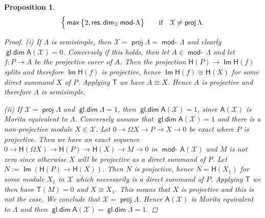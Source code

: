 \documentclass[oneside, a4paper,reqno]{amsart}
\numberwithin{equation}{section}
\newtheorem{prop}[thm]{Proposition}
\theoremstyle{definition}
\begin{document}
\begin{prop}
\[\begin{cases}
\, \operatorname*{\mathsf{max}}\big\{2,\operatorname*{\mathsf{res.dim}}_{\mathcal X}\operatorname*{\mathsf{mod}-\!}\Lambda\big\} \,\,\, & \,\,\, \text{if
\,\, ${\mathcal X}\neq \operatorname*{\mathsf{proj}}\Lambda$.}
\end{cases}
\]
\begin{proof}
(i) If $\Lambda$ is semisimple, then ${\mathcal X} = \operatorname*{\mathsf{proj}}\Lambda =
\operatorname*{\mathsf{mod}-\!}\Lambda$ and clearly $\operatorname*{\mathsf{gl.dim}}\mathsf{A}({\mathcal X}) = 0$. Conversely if
this holds, then let $A\in \operatorname*{\mathsf{mod}-\!}\Lambda$ and let $f \colon P {\longrightarrow} A$
be the projective cover of $A$. Then the projection $\mathsf{H}(P)
\to \operatorname*{\mathsf{Im}}\mathsf{H}(f)$ splits and therefore $\operatorname*{\mathsf{Im}}\mathsf{H}(f)$
is projective, hence $\operatorname*{\mathsf{Im}}\mathsf{H}(f) \cong \mathsf{H}(X)$ for
some direct summand $X$ of $P$. Applying  $\mathsf{T}$ we have $A
\cong X$. Hence $A$ is projective and therefore $\Lambda$ is
semisimple.

(ii) If ${\mathcal X} = \operatorname*{\mathsf{proj}}\Lambda$ and $\operatorname*{\mathsf{gl.dim}}\Lambda = 1$, then
$\operatorname*{\mathsf{gl.dim}}\mathsf{A}({\mathcal X}) = 1$, since $\mathsf{A}({\mathcal X})$ is Morita equivalent
to $\Lambda$. Conversely assume that $\operatorname*{\mathsf{gl.dim}}\mathsf{A}({\mathcal X}) = 1$ and
there is a non-projective module $X\in {\mathcal X}$. Let $0 {\longrightarrow} \Omega X
{\longrightarrow}  P {\longrightarrow} X {\longrightarrow} 0$ be exact where $P$ is projective. Then we
have an exact sequence $0 {\longrightarrow} \mathsf{H}(\Omega X) {\longrightarrow}
\mathsf{H}(P) {\longrightarrow} \mathsf{H}(X) {\longrightarrow} M {\longrightarrow} 0$ in
$\operatorname*{\mathsf{mod}-\!}\mathsf{A}({\mathcal X})$ and $M$ is not zero since otherwise $X$ will
be projective as a direct summand of $P$. Let $N :=
\operatorname*{\mathsf{Im}}(\mathsf{H}(P) \to \mathsf{H}(X))$. Then $N$ is projective,
hence $N = \mathsf{H}(X_{1})$ for some module $X_{1}$ in ${\mathcal X}$ which
necessarily is a direct summand of $P$. Applying $\mathsf{T}$ we
then have $\mathsf{T}(M) = 0$ and $X \cong X_{1}$. This means that
$X$ is projective and this is not the case. We conclude that ${\mathcal X} =
\operatorname*{\mathsf{proj}}\Lambda$. Hence $\mathsf{A}({\mathcal X})$ is Morita equivalent to
$\Lambda$ and then $\operatorname*{\mathsf{gl.dim}}\mathsf{A}({\mathcal X}) = \operatorname*{\mathsf{gl.dim}}\Lambda = 1$.


\end{proof}
\end{prop}
\end{document}
